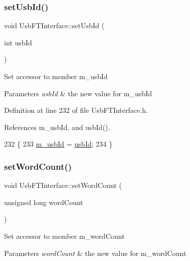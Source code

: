 \subsubsection{\texorpdfstring{set\+Usb\+Id()}{setUsbId()}}
{\footnotesize\ttfamily void Usb\+F\+T\+Interface\+::set\+Usb\+Id (\begin{DoxyParamCaption}\item[{int}]{usb\+Id }\end{DoxyParamCaption})\hspace{0.3cm}{\ttfamily [inline]}}

Set accessor to member m\+\_\+usb\+Id 
\begin{DoxyParams}{Parameters}
{\em usb\+Id} & the new value for m\+\_\+usb\+Id \\
\hline
\end{DoxyParams}


Definition at line 232 of file Usb\+F\+T\+Interface.\+h.



References m\+\_\+usb\+Id, and usb\+Id().


\begin{DoxyCode}
232                             \{
233     \hyperlink{classUsbFTInterface_a91df5c0547e8be460bc087e27afe05aa}{m\_usbId} = \hyperlink{classUsbFTInterface_a2a63b462eb5831b4aef9d0f4c8d6ee1a}{usbId};
234   \}
\end{DoxyCode}
\mbox{\label{classUsbFTInterface_a8251b4faa76c380ea41d795482532e30}} 
\subsubsection{\texorpdfstring{set\+Word\+Count()}{setWordCount()}}
{\footnotesize\ttfamily void Usb\+F\+T\+Interface\+::set\+Word\+Count (\begin{DoxyParamCaption}\item[{unsigned long}]{word\+Count }\end{DoxyParamCaption})\hspace{0.3cm}{\ttfamily [inline]}}

Set accessor to member m\+\_\+word\+Count 
\begin{DoxyParams}{Parameters}
{\em word\+Count} & the new value for m\+\_\+word\+Count \\
\hline
\end{DoxyParams}



